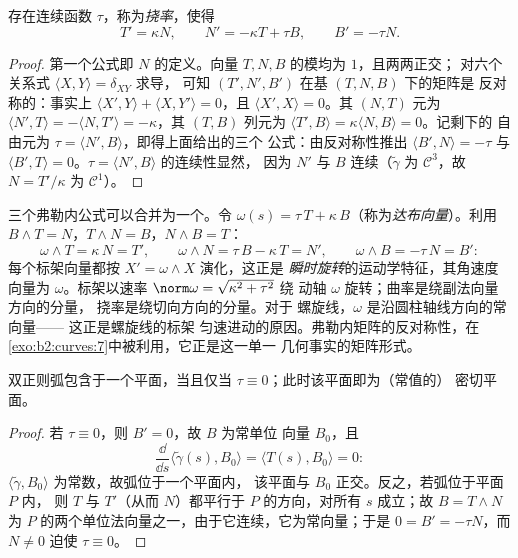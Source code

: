 \begin{theorem}[空间中的弗勒内公式]\label{thm:b2:curves:frenet3d}
存在连续函数 $\tau$，称为\emph{挠率}，使得
\[
T' = \kappa N, \qquad
N' = -\kappa T + \tau B, \qquad
B' = -\tau N .
\]
\end{theorem}

\begin{proof}
第一个公式即 $N$ 的定义。向量
$T, N, B$ 的模均为 $1$，且两两正交；
对六个关系式 $\langle X, Y\rangle = \delta_{XY}$ 求导，
可知 $(T', N', B')$ 在基 $(T, N, B)$ 下的矩阵是
反对称的：事实上 $\langle X', Y\rangle + \langle X, Y'\rangle = 0$，且
$\langle X', X\rangle = 0$。其 $(N, T)$ 元为 $\langle N', T\rangle =
-\langle N, T'\rangle = -\kappa$，其 $(T, B)$ 列元为
$\langle T', B\rangle = \kappa\langle N, B\rangle = 0$。记剩下的
自由元为 $\tau = \langle N', B\rangle$，即得上面给出的三个
公式：由反对称性推出 $\langle B', N\rangle = -\tau$ 与
$\langle B', T\rangle = 0$。$\tau = \langle N', B\rangle$ 的连续性显然，
因为 $N'$ 与 $B$ 连续（$\tilde\gamma$ 为
$\mathcal{C}^3$，故 $N = T'/\kappa$ 为 $\mathcal{C}^1$）。
\end{proof}

\begin{example}[达布向量]\label{ex:b2:curves:darboux}
三个弗勒内公式可以合并为一个。令 $\omega(s) =
\tau\,T + \kappa\,B$（称为\emph{达布向量}）。利用 $B
\wedge T = N$，$T \wedge N = B$，$N \wedge B = T$：
\[
\omega \wedge T = \kappa\,N = T', \qquad
\omega \wedge N = \tau\,B - \kappa\,T = N', \qquad
\omega \wedge B = -\tau\,N = B' :
\]
每个标架向量都按 $X' = \omega \wedge X$ 演化，这正是
\emph{瞬时旋转}的运动学特征，其角速度向量为
$\omega$。标架以速率
$\norm\omega = \sqrt{\kappa^2 + \tau^2}$ 绕
动轴 $\omega$ 旋转；曲率是绕副法向量方向的分量，
挠率是绕切向方向的分量。对于
螺旋线，$\omega$ 是沿圆柱轴线方向的常向量——
这正是螺旋线的标架
匀速进动的原因。弗勒内矩阵的反对称性，在
\cref{exo:b2:curves:7}中被利用，它正是这一单一
几何事实的矩阵形式。
\end{example}

\begin{proposition}[挠率刻画平面性]\label{prop:b2:curves:torsion}
双正则弧包含于一个平面，当且仅当 $\tau
\equiv 0$；此时该平面即为（常值的）
密切平面。
\end{proposition}

\begin{proof}
若 $\tau \equiv 0$，则 $B' = 0$，故 $B$ 为常单位
向量 $B_0$，且
\[
\frac{\dd}{\dd s}\langle \tilde\gamma(s), B_0\rangle
= \langle T(s), B_0\rangle = 0 :
\]
$\langle \tilde\gamma, B_0\rangle$ 为常数，故弧位于一个平面内，
该平面与 $B_0$ 正交。反之，若弧位于平面 $P$ 内，
则 $T$ 与 $T'$（从而 $N$）都平行于
$P$ 的方向，对所有 $s$ 成立；故 $B = T \wedge N$ 为
$P$ 的两个单位法向量之一，由于它连续，它为常向量；于是 $0 = B'
= -\tau N$，而 $N \neq 0$ 迫使 $\tau \equiv 0$。
\end{proof}


